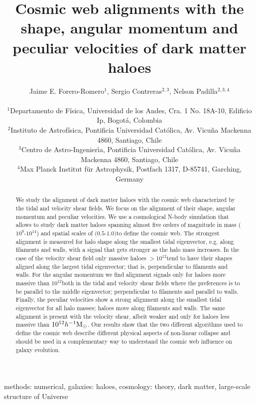 \documentclass[useAMS,usenatbib]{mn2e}
\newcommand{\hMpc}{{\ifmmode{h^{-1}{\rm Mpc}}\else{$h^{-1}$Mpc }\fi}}
\newcommand{\hMsun}{{\ifmmode{h^{-1}{\rm
        {M_{\odot}}}}\else{$h^{-1}{\rm{M_{\odot}}}$~}\fi}}
\begin{document}
\title[Halo alignments with the cosmic web]{Cosmic web alignments with
  the shape, angular momentum and peculiar velocities of dark matter
  haloes}  
\author[J.E. Forero-Romero et al.]{
\parbox[t]{\textwidth}{\raggedright
  Jaime E. Forero-Romero$^{1}$,
  Sergio Contreras$^{2,3}$,
  Nelson Padilla$^{2,3,4}$
}
\vspace*{6pt}\\
$^{1}$Departamento de F\'{i}sica, Universidad de los Andes, Cra. 1
No. 18A-10, Edificio Ip, Bogot\'a, Colombia\\
$^{2}$Instituto de Astrofísica, Pontificia Universidad Cat\'olica,
Av. Vicu\~na Mackenna 4860, Santiago, Chile\\
$^{3}$Centro de Astro-Ingenier\'\i a, Pontificia Universidad Cat\'olica,
Av. Vicu\~na Mackenna 4860, Santiago, Chile\\
$^{4}$Max Planck Institut f\"ur Astrophysik, Postfach 1317, D-85741, Garching, Germany\\
}
\maketitle

\begin{abstract}
We study the alignment of dark matter haloes with the cosmic web
characterized by the tidal and velocity shear fields. We focus on the
alignment of their shape, angular momentum and peculiar velocities. We  
use a cosmological N-body simulation that allows to study dark matter
haloes spanning almost five orders of magnitude in mass
($10^{9}$-$10^{14}$) \hMsun and spatial scales of
$(0.5$-$1.0)$\hMpc to define the cosmic web. The strongest alignment
is measured for halo shape along the smallest tidal eigenvector,
e.g. along filaments and walls, with a signal that gets stronger as
the halo mass increases. In the case of the velocity shear field only
massive haloes $>10^{12}$\hMsun tend to have their shapes aligned along
the largest tidal eigenvector; that is, perpendicular to filaments and
walls. For the angular momentum we find alignment signals only for
haloes more massive than $10^{12}$\hMsun both in the tidal and velocity
shear fields where the preferences is to be parallel to the
middle eigenvector; perpendicular to filaments and parallel to
walls. Finally, the peculiar velocities show a strong alignment along
the smallest tidal eigenvector for all halo masses; haloes move along filaments
and walls. The same alignment is present with the velocity shear,
albeit weaker and only for haloes less massive than $10^{12}\hMsun$. Our
results show that the two different algorithms used to
define the cosmic web describe different physical aspects of
non-linear collapse and should be used in a complementary way to
understand the cosmic web influence on galaxy evolution.    
\end{abstract}
\begin{keywords}
methods: numerical, galaxies: haloes, cosmology: theory, dark
matter, large-scale structure of Universe
\end{keywords}
\end{document}
